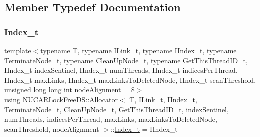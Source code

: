 \subsection{Member Typedef Documentation}
\mbox{\label{class_n_u_c_a_r_lock_free_d_s_1_1_allocator_a2776cca35e8343bf5007bd8b6f3a3f8f}} 
\subsubsection{\texorpdfstring{Index\+\_\+t}{Index\_t}}
{\footnotesize\ttfamily template$<$typename T, typename I\+Link\+\_\+t, typename I\+Index\+\_\+t, typename Terminate\+Node\+\_\+t, typename Clean\+Up\+Node\+\_\+t, typename Get\+This\+Thread\+I\+D\+\_\+t, I\+Index\+\_\+t index\+Sentinel, I\+Index\+\_\+t num\+Threads, I\+Index\+\_\+t indices\+Per\+Thread, I\+Index\+\_\+t max\+Links, I\+Index\+\_\+t max\+Links\+To\+Deleted\+Node, I\+Index\+\_\+t scan\+Threshold, unsigned long long int node\+Alignment = 8$>$ \\
using \mbox{\hyperlink{class_n_u_c_a_r_lock_free_d_s_1_1_allocator}{N\+U\+C\+A\+R\+Lock\+Free\+D\+S\+::\+Allocator}}$<$ T, I\+Link\+\_\+t, I\+Index\+\_\+t, Terminate\+Node\+\_\+t, Clean\+Up\+Node\+\_\+t, Get\+This\+Thread\+I\+D\+\_\+t, index\+Sentinel, num\+Threads, indices\+Per\+Thread, max\+Links, max\+Links\+To\+Deleted\+Node, scan\+Threshold, node\+Alignment $>$\+::\mbox{\hyperlink{class_n_u_c_a_r_lock_free_d_s_1_1_allocator_a2776cca35e8343bf5007bd8b6f3a3f8f}{Index\+\_\+t}} =  I\+Index\+\_\+t}

\mbox{\label{class_n_u_c_a_r_lock_free_d_s_1_1_allocator_a5508d82b795e6c1977bebb67b5e5b686}} 
